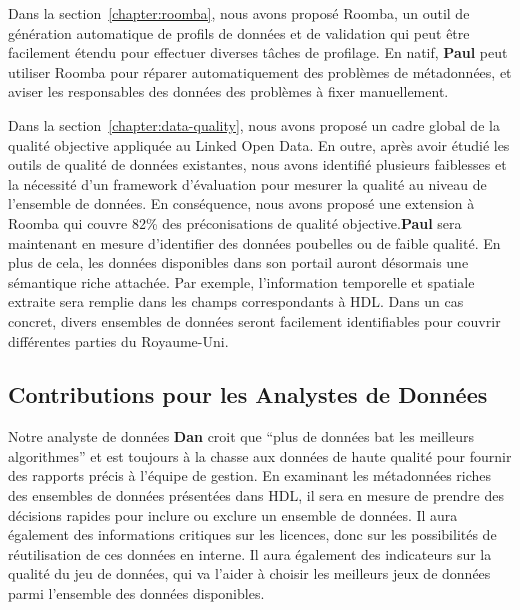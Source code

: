Dans la section~\ref{chapter:roomba}, nous avons propos\'{e} Roomba, un outil de g\'{e}n\'{e}ration automatique de profils de donn\'{e}es et de validation qui peut être facilement \'{e}tendu pour effectuer diverses tâches de profilage. En natif, \textbf{Paul} peut utiliser Roomba pour r\'{e}parer automatiquement des probl\`{e}mes de m\'{e}tadonn\'{e}es, et aviser les responsables des donn\'{e}es des probl\`{e}mes à fixer manuellement.

Dans la section~\ref{chapter:data-quality}, nous avons propos\'{e} un cadre global de la qualit\'{e} objective appliqu\'{e}e au Linked Open Data. En outre, apr\`{e}s avoir \'{e}tudi\'{e} les outils de qualit\'{e} de donn\'{e}es existantes, nous avons identifi\'{e} plusieurs faiblesses et la n\'{e}cessit\'{e} d'un framework d'\'{e}valuation pour mesurer la qualit\'{e} au niveau de l'ensemble de donn\'{e}es. En cons\'{e}quence, nous avons propos\'{e} une extension à Roomba qui couvre 82\% des pr\'{e}conisations de qualit\'{e} objective.\textbf{Paul} sera maintenant en mesure d'identifier des donn\'{e}es poubelles ou de faible qualit\'{e}. En plus de cela, les donn\'{e}es disponibles dans son portail auront d\'{e}sormais une s\'{e}mantique riche attach\'{e}e. Par exemple, l'information temporelle et spatiale extraite sera remplie dans les champs correspondants à HDL. Dans un cas concret, divers ensembles de donn\'{e}es seront facilement identifiables pour couvrir diff\'{e}rentes parties du Royaume-Uni.

\subsection{Contributions pour les Analystes de Donn\'{e}es}

Notre analyste de donn\'{e}es \textbf{Dan} croit que ``plus de donn\'{e}es bat les meilleurs algorithmes'' et est toujours à la chasse aux donn\'{e}es de haute qualit\'{e} pour fournir des rapports pr\'{e}cis à l'\'{e}quipe de gestion. En examinant les m\'{e}tadonn\'{e}es riches des ensembles de donn\'{e}es pr\'{e}sent\'{e}es dans HDL, il sera en mesure de prendre des d\'{e}cisions rapides pour inclure ou exclure un ensemble de donn\'{e}es. Il aura \'{e}galement des informations critiques sur les licences, donc sur les possibilit\'{e}s de r\'{e}utilisation de ces donn\'{e}es en interne. Il aura \'{e}galement des indicateurs sur la qualit\'{e} du jeu de donn\'{e}es, qui va l'aider à choisir les meilleurs jeux de donn\'{e}es parmi l'ensemble des donn\'{e}es disponibles.

